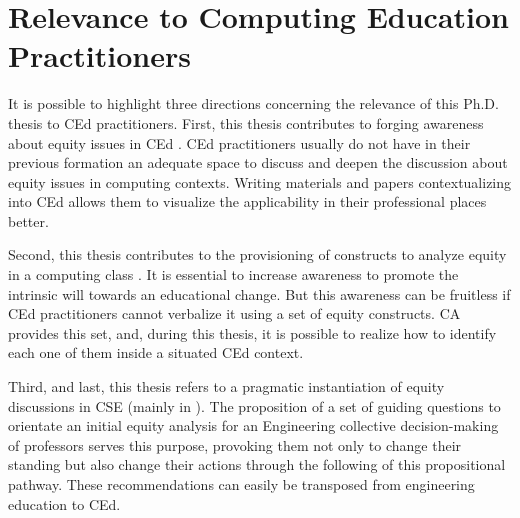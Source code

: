 \section{Relevance to Computing Education Practitioners}
\label{intro-sec:rel-computing}

It is possible to highlight three directions concerning the relevance of this \gls{Ph.D.} thesis to \gls{CEd} practitioners. First, this thesis contributes to forging awareness about equity issues in \gls{CEd} \cite{bispojr:2022-educomp}. \gls{CEd} practitioners usually do not have in their previous formation an adequate space to discuss and deepen the discussion about equity issues in computing contexts. Writing materials and papers contextualizing into \gls{CEd} allows them to visualize the applicability in their professional places better.

Second, this thesis contributes to the provisioning of constructs to analyze equity in a computing class \cite{bispojr:2024-nmp}. It is essential to increase awareness to promote the intrinsic will towards an educational change. But this awareness can be fruitless if \gls{CEd} practitioners cannot verbalize it using a set of equity constructs. \gls{CA} provides this set, and, during this thesis, it is possible to realize how to identify each one of them inside a situated \gls{CEd} context.

Third, and last, this thesis refers to a pragmatic instantiation of equity discussions in \gls{CSE} (mainly in \cite{bispojr:2024-online-lab}). The proposition of a set of guiding questions to orientate an initial equity analysis for an Engineering collective decision-making of professors serves this purpose, provoking them not only to change their standing but also change their actions through the following of this propositional pathway. These recommendations can easily be transposed from engineering education to \gls{CEd}.
                